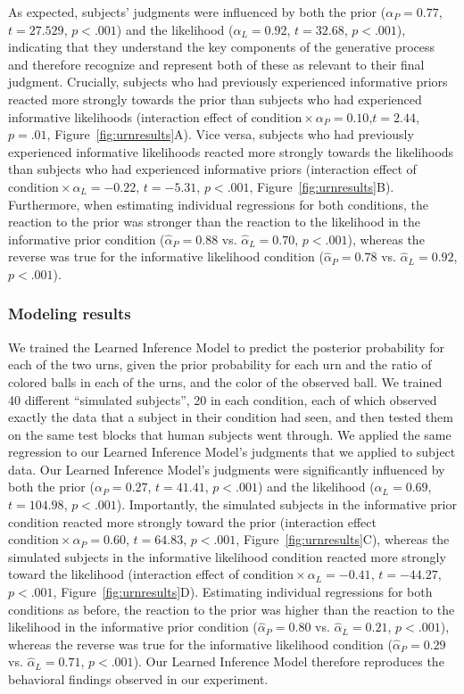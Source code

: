 As expected, subjects' judgments were influenced by both the prior ($\alpha_P=0.77$, $t=27.529$, $p<.001$) and the likelihood ($\alpha_L=0.92$, $t=32.68$, $p<.001$), indicating that they understand the key components of the generative process and therefore recognize and represent both of these as relevant to their final judgment. Crucially, subjects who had previously experienced informative priors reacted more strongly towards the prior than subjects who had experienced informative likelihoods (interaction effect of $\text{condition}\times\alpha_P=0.10$,$t=2.44$, $p=.01$, Figure~\ref{fig:urnresults}A). Vice versa, subjects who had previously experienced informative likelihoods reacted more strongly towards the likelihoods than subjects who had experienced informative priors (interaction effect of $\text{condition}\times\alpha_L=-0.22$, $t=-5.31$, $p<.001$, Figure~\ref{fig:urnresults}B). Furthermore, when estimating individual regressions for both conditions, the reaction to the prior was stronger than the reaction to the likelihood in the informative prior condition ($\hat{\alpha}_P=0.88$ vs. $\hat{\alpha}_L=0.70$, $p<.001$), whereas the reverse was true for the informative likelihood condition ($\hat{\alpha}_P=0.78$ vs. $\hat{\alpha}_L=0.92$, $p<.001$).

\subsubsection{Modeling results}

We trained the Learned Inference Model to predict the posterior probability for each of the two urns, given the prior probability for each urn and the ratio of colored balls in each of the urns, and the color of the observed ball. We trained 40 different ``simulated subjects'', 20 in each condition, each of which observed exactly the data that a subject in their condition had seen, and then tested them on the same test blocks that human subjects went through. We applied the same regression to our Learned Inference Model's judgments that we applied to subject data. Our Learned Inference Model's judgments were significantly influenced by both the prior ($\alpha_P= 0.27$, $t=41.41$, $p<.001$) and the likelihood ($\alpha_L=0.69$, $t=104.98$, $p<.001$). Importantly, the simulated subjects in the informative prior condition reacted more strongly toward the prior (interaction effect $\text{condition}\times\alpha_P=0.60$, $t=64.83$, $p<.001$, Figure~\ref{fig:urnresults}C), whereas the simulated subjects in the informative likelihood condition reacted more strongly toward the likelihood (interaction effect of $\text{condition}\times\alpha_L=-0.41$, $t=-44.27$, $p<.001$, Figure~\ref{fig:urnresults}D). Estimating individual regressions for both conditions as before, the reaction to the prior was higher than the reaction to the likelihood in the informative prior condition ($\hat{\alpha}_P=0.80$ vs. $\hat{\alpha}_L=0.21$, $p<.001$), whereas the reverse was true for the informative likelihood condition ($\hat{\alpha}_P=0.29$ vs. $\hat{\alpha}_L=0.71$, $p<.001$). Our Learned Inference Model therefore reproduces the behavioral findings observed in our experiment.

